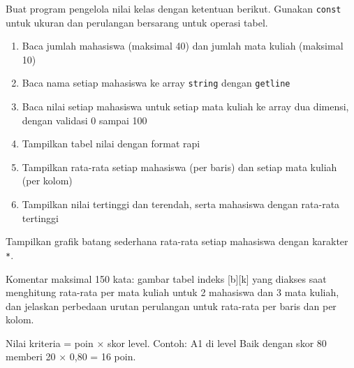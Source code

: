 \documentclass[a4paper]{article}
\begin{document}
Buat program pengelola nilai kelas dengan ketentuan berikut. Gunakan \texttt{const} untuk ukuran dan perulangan bersarang untuk operasi tabel.
\begin{enumerate}
\item Baca jumlah mahasiswa (maksimal 40) dan jumlah mata kuliah (maksimal 10)
\item Baca nama setiap mahasiswa ke array \texttt{string} dengan \texttt{getline}
\item Baca nilai setiap mahasiswa untuk setiap mata kuliah ke array dua dimensi, dengan validasi 0 sampai 100
\item Tampilkan tabel nilai dengan format rapi
\item Tampilkan rata-rata setiap mahasiswa (per baris) dan setiap mata kuliah (per kolom)
\item Tampilkan nilai tertinggi dan terendah, serta mahasiswa dengan rata-rata tertinggi
\end{enumerate}
\begin{Contoh}
Tampilkan grafik batang sederhana rata-rata setiap mahasiswa dengan karakter \texttt{*}.
\end{Contoh}
Komentar maksimal 150 kata: gambar tabel indeks [b][k] yang diakses saat menghitung rata-rata per mata kuliah untuk 2 mahasiswa dan 3 mata kuliah, dan jelaskan perbedaan urutan perulangan untuk rata-rata per baris dan per kolom.

\par\vspace{4pt}\par\vspace{6pt}
Nilai kriteria = poin × skor level. Contoh: A1 di level Baik dengan skor 80 memberi 20 × 0,80 = 16 poin.
\end{document}
